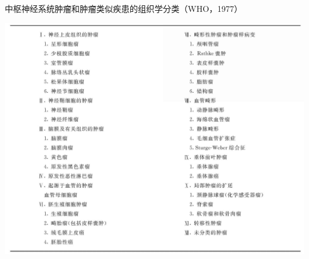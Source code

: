\begin{table}[htbp]
\centering
\caption{中枢神经系统肿瘤和肿瘤类似疾患的组织学分类（WHO，1977）}
\label{tab2-3}
\includegraphics[width=\textwidth,height=\textheight,keepaspectratio]{./images/Image00059.jpg}
\end{table}

